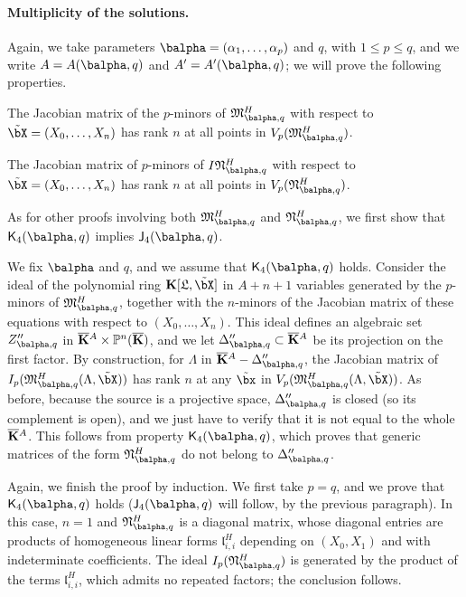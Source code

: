 \documentclass[12pt]{article}
\begin{document}
\paragraph{Multiplicity of the solutions.} 
Again, we take parameters $\balpha=(\alpha_1,\dots,\alpha_p)$ and $q$,
with $1 \le p \le q$, and we write $A=A(\balpha,q)$ and
$A'=A'(\balpha,q)$; we will prove the following properties.
\begin{description}[leftmargin=*]
\item[$\assI_4(\balpha,q).$] The Jacobian matrix of
  the $p$-minors of $\mathfrak{M}^H_{\balpha,q}$ with respect to
  $\tilde\bX=(X_0,\dots,X_n)$ has rank $n$ at all points in
  $V_p(\mathfrak{M}^H_{\balpha,q})$.
\item[$\assJ_4(\balpha,q).$] The Jacobian matrix of
  $p$-minors of $I\mathfrak{N}^H_{\balpha,q}$ with respect to
  $\tilde\bX=(X_0,\dots,X_n)$ has rank $n$ at all points in
  $V_p(\mathfrak{N}^H_{\balpha,q})$.
\end{description}
As for other proofs involving both $\mathfrak{M}^H_{\balpha,q}$ and
$\mathfrak{N}^H_{\balpha,q}$, we first show that $\assJ_4(\balpha,q)$
implies $\assI_4(\balpha,q)$.

We fix $\balpha$ and $q$, and we assume that $\assJ_4(\balpha,q)$
holds. Consider the ideal of the polynomial ring
$\KK[\mathfrak{L},\tilde\bX]$ in $A+n+1$ variables generated by the
$p$-minors of $\mathfrak{M}^H_{\balpha,q}$, together with the
$n$-minors of the Jacobian matrix of these equations with respect to
$(X_0,\dots,X_n)$. This ideal defines an algebraic set
$Z''_{\balpha,q}$ in $\overline{\mathbf{K}}{}^A \times \mathbb{P}^n(\overline{\mathbf{K}})$, and we let
$\Delta''_{\balpha,q} \subset \KKbar{}^A$ be its projection on the
first factor. By construction, for $\Lambda$ in
$\KKbar{}^A-\Delta''_{\balpha,q}$, the Jacobian matrix of
$I_p(\mathfrak{M}^H_{\balpha,q}(\Lambda,\tilde\bX))$ has rank $n$ at
any $\tilde\bx$ in
$V_p(\mathfrak{M}^H_{\balpha,q}(\Lambda,\tilde\bX))$. As before,
because the source is a projective space, $\Delta''_{\balpha,q}$ is closed
(so its complement is open), and we just have to verify that it is not
equal to the whole $\overline{\mathbf{K}}{}^A$. This follows from property
$\assJ_4(\balpha,q)$, which proves that generic matrices of the form
$\mathfrak{N}^H_{\balpha,q}$ do not belong to $\Delta''_{\balpha,q}$.

Again, we finish the proof by induction. We first take $p=q$, and we
prove that $\assJ_4(\balpha,q)$ holds ($\assI_4(\balpha,q)$ will
follow, by the previous paragraph). In this case, $n=1$ and
$\mathfrak{N}^H_{\balpha,q}$ is a diagonal matrix, whose diagonal
entries are products of homogeneous linear forms
$\mathfrak{l}^H_{i,i}$ depending on $(X_0,X_1)$ and with indeterminate
coefficients. The ideal $I_p(\mathfrak{N}^H_{\balpha,q})$ is generated
by the product of the terms $\mathfrak{l}^H_{i,i}$, which admits no
repeated factors; the conclusion follows.
\end{document}
